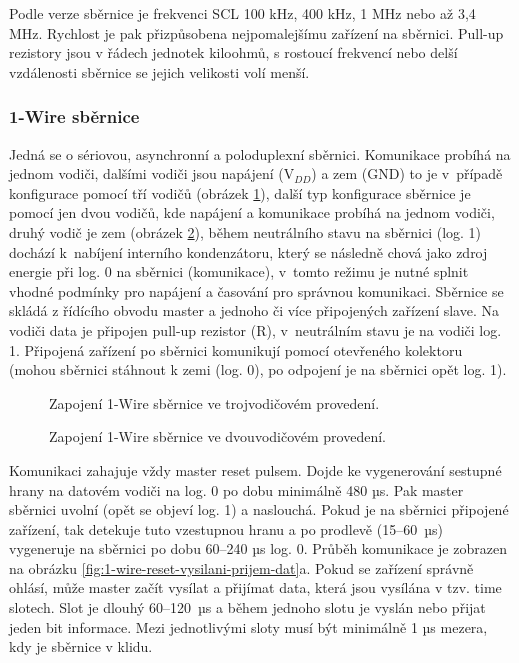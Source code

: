 Podle verze sběrnice je frekvenci SCL 100 kHz, 400 kHz, 1 MHz nebo až 3,4 MHz. Rychlost je pak přizpůsobena nejpomalejšímu zařízení na sběrnici. Pull-up rezistory jsou v řádech jednotek kiloohmů, s rostoucí frekvencí nebo delší vzdálenosti sběrnice se jejich velikosti volí menší.




\subsubsection{1-Wire sběrnice}
\label{sec:1-wire-sbernice}
Jedná se o sériovou, asynchronní a poloduplexní sběrnici. Komunikace probíhá na jednom vodiči, dalšími vodiči jsou napájení (V$_{DD}$) a zem (GND) to je v~případě konfigurace pomocí tří vodičů (obrázek \ref{fig:1-wire-sbernice-tri-vodice}), další typ konfigurace sběrnice je pomocí jen dvou vodičů, kde napájení a komunikace probíhá na jednom vodiči, druhý vodič je zem (obrázek \ref{fig:1-wire-sbernice-dva-vodice}), během neutrálního stavu na sběrnici (log. 1) dochází k~nabíjení interního kondenzátoru, který se následně chová jako zdroj energie při log. 0 na sběrnici (komunikace), v~tomto režimu je nutné splnit vhodné podmínky pro napájení a časování pro správnou komunikaci. Sběrnice se skládá z řídícího obvodu master a jednoho či více připojených zařízení slave. Na vodiči data je připojen pull-up rezistor (R), v~neutrálním stavu je na vodiči log. 1. Připojená zařízení po sběrnici komunikují pomocí otevřeného kolektoru (mohou sběrnici stáhnout k zemi (log. 0), po odpojení je na sběrnici opět log. 1).

\begin{figure}[H]
    \centering
    \def\svgwidth{\columnwidth}
    
    \caption{Zapojení 1-Wire sběrnice ve trojvodičovém provedení.}
    \label{fig:1-wire-sbernice-tri-vodice}
\end{figure}

\begin{figure}[H]
    \centering
    \def\svgwidth{\columnwidth}
    
    \caption{Zapojení 1-Wire sběrnice ve dvouvodičovém provedení.}
    \label{fig:1-wire-sbernice-dva-vodice}
\end{figure}

Komunikaci zahajuje vždy master reset pulsem. Dojde ke vygenerování sestupné hrany na datovém vodiči na log. 0 po dobu minimálně 480 µs. Pak master sběrnici uvolní (opět se objeví log. 1) a naslouchá. Pokud je na sběrnici připojené zařízení, tak detekuje tuto vzestupnou hranu a po prodlevě (15–60~µs) vygeneruje na sběrnici po dobu 60–240 µs log. 0. Průběh komunikace je zobrazen na obrázku \ref{fig:1-wire-reset-vysilani-prijem-dat}a. Pokud se zařízení správně ohlásí, může master začít vysílat a přijímat data, která jsou vysílána v tzv. time slotech. Slot je dlouhý 60–120~µs a během jednoho slotu je vyslán nebo přijat jeden bit informace. Mezi jednotlivými sloty musí být minimálně 1 µs mezera, kdy je sběrnice v klidu. 

